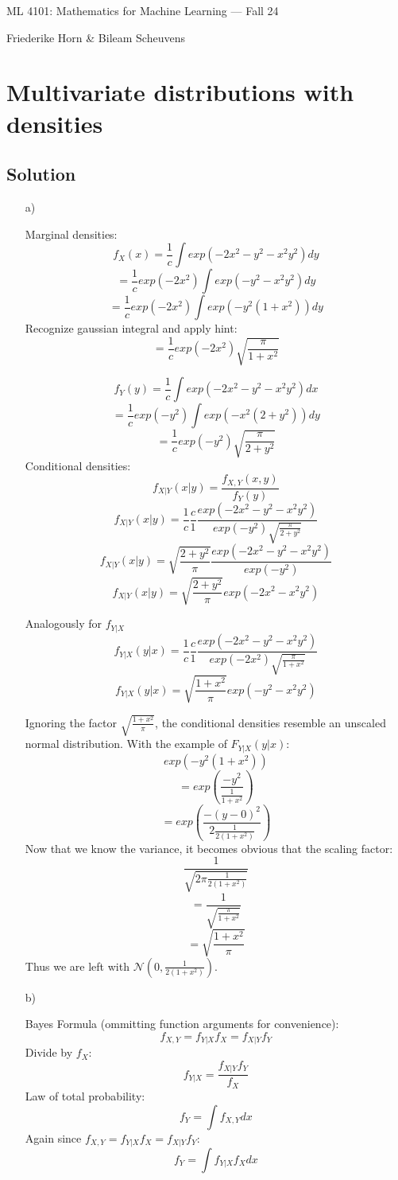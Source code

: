 \documentclass[10pt]{article}
\numberwithin{equation}{section}
\begin{document}
\begin{center}
    \sc ML 4101: Mathematics for Machine Learning --- Fall 24
\end{center}

\noindent Friederike Horn \& Bileam Scheuvens

\section*{Multivariate distributions with densities}

\subsection*{Solution}
\begin{enumerate}
  \item[a)]{
      Marginal densities:
      $$f_X(x) = \frac{1}{c} \int exp(-2x^2 -y^2 -x^2y^2)dy$$
      $$= \frac{1}{c} exp(-2x^2) \int exp(-y^2 -x^2y^2)dy$$
      $$= \frac{1}{c} exp(-2x^2) \int exp(-y^2(1+x^2))dy$$
      Recognize gaussian integral and apply hint:
      $$= \frac{1}{c} exp(-2x^2) \sqrt{\frac{\pi}{1+x^2}}$$

      $$f_Y(y) = \frac{1}{c} \int exp(-2x^2 -y^2 -x^2y^2)dx$$
      $$= \frac{1}{c} exp(-y^2) \int exp(-x^2(2+y^2))dy$$
      $$= \frac{1}{c} exp(-y^2) \sqrt{\frac{\pi}{2+y^2}}$$
      Conditional densities:
      $$f_{X|Y}(x|y) = \frac{f_{X,Y}(x,y)}{f_Y(y)}$$
      $$f_{X|Y}(x|y) = \frac{1}{c} \frac{c}{1} \frac{exp(-2x^2-y^2-x^2y^2)}{exp(-y^2) \sqrt{\frac{\pi}{2+y^2}}}$$
      $$f_{X|Y}(x|y) =\sqrt{\frac{2+y^2}{\pi}} \frac{exp(-2x^2-y^2-x^2y^2)}{exp(-y^2) }$$
      $$f_{X|Y}(x|y) =\sqrt{\frac{2+y^2}{\pi}} exp(-2x^2-x^2y^2)$$

      Analogously for $f_{Y|X}$
      $$f_{Y|X}(y|x) = \frac{1}{c} \frac{c}{1} \frac{exp(-2x^2-y^2-x^2y^2)}{exp(-2x^2) \sqrt{\frac{\pi}{1+x^2}}}$$
      $$f_{Y|X}(y|x) =\sqrt{\frac{1+x^2}{\pi}} exp(-y^2-x^2y^2)$$
    }
    Ignoring the factor $\sqrt{\frac{1+x^2}{\pi}}$, the conditional densities resemble an unscaled normal distribution. With the example of $F_{Y|X}(y|x)$: 
    $$exp(-y^2(1+x^2))$$
    $$=exp(\frac{-y^2}{\frac{1}{1+x^2}})$$
    $$=exp(\frac{-(y-0)^2}{2\frac{1}{2(1+x^2)}})$$
    Now that we know the variance, it becomes obvious that the scaling factor:
    $$\frac{1}{\sqrt{2\pi \frac{1}{2(1+x^2)}}}$$
    $$=\frac{1}{\sqrt{\frac{\pi}{1+x^2}}}$$
    $$=\sqrt{\frac{1+x^2}{\pi}}$$
    Thus we are left with $\mathcal{N}(0, \frac{1}{2(1+x^2)})$.

  \item[b)]{
      Bayes Formula (ommitting function arguments for convenience):
      $$f_{X,Y} = f_{Y|X} f_X = f_{X|Y} f_Y$$
      Divide by $f_X$:
      $$f_{Y|X} = \frac{f_{X|Y}f_Y}{f_X}$$
      Law of total probability:
      $$f_Y = \int f_{X,Y} dx$$
      Again since $f_{X,Y} = f_{Y|X} f_X = f_{X|Y} f_Y$:
      $$f_Y = \int f_{Y|X} f_X dx$$

  }
\end{enumerate}
\end{document}
